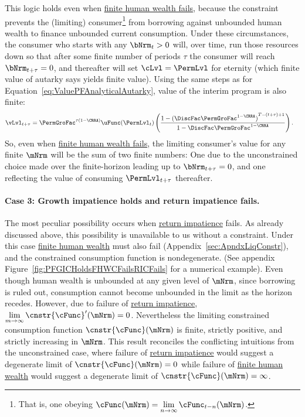 \documentclass[BufferStockTheory]{subfiles}
\begin{document}
This logic holds even when \hyperlink{FHWC}{finite human wealth fails}, because the constraint prevents the (limiting) consumer\footnote{That is, one obeying $\cFunc(\mNrm) = \lim\limits_{n \rightarrow \infty} \cFunc_{t-n}(\mNrm)$.} from borrowing against unbounded human wealth to finance unbounded current consumption.  Under these circumstances, the consumer who starts with any $\bNrm_{t} > 0$ will, over time, run those resources down so that after some finite number of periods $\tau$ the consumer will reach $\bNrm_{t+\tau} = 0$, and thereafter will set $\cLvl = \PermLvl$ for eternity (which \hypertarget{PFFVAC}{finite value of autarky} says yields finite value).  Using the same steps as for Equation~\eqref{eq:ValuePFAnalyticalAutarky}, value of the interim program is also finite: \hypertarget{PFFVAC}{} \hypertarget{PFVAFacDefn}{}
\begin{align*}
  \vLvl_{t+\tau} 
  & = \PermGroFac^{\tau(1-\CRRA)} \uFunc(\PermLvl_{t})\left(\frac{1-{(\DiscFac \PermGroFac^{1-\CRRA})}^{T-(t+\tau)+1}}{1-\DiscFac \PermGroFac^{1-\CRRA}}\right).
\end{align*}
So, even when \hyperlink{FHWC}{finite human wealth fails}, the limiting consumer's value for any finite $\mNrm$ will be the sum of two finite numbers: One due to the unconstrained choice made over the finite-horizon leading up to $\bNrm_{t+\tau} = 0$, and one reflecting the value of consuming $\PermLvl_{t+\tau}$ thereafter.

\hypertarget{RICandFHWCFail}{}
\paragraph{Case 3: Growth impatience holds and return impatience fails.} The most peculiar possibility occurs when   \hyperlink{RIC}{return impatience} fails. As already discussed above, this possibility is unavailable to us without a constraint. Under this case \hyperlink{FHWC}{finite human wealth} must also fail (Appendix~\ref{sec:ApndxLiqConstr}), and the constrained consumption function is nondegenerate.  (See appendix Figure~\ref{fig:PFGICHoldsFHWCFailsRICFails} for a numerical example). Even though human wealth is unbounded at any given level of $\mNrm$, since borrowing is ruled out, consumption cannot become unbounded in the limit as the horizon recedes. However, due to failure of \hyperlink{RIC}{return impatience},  $\lim\limits_{m \rightarrow \infty} \cnstr{\cFunc}^{\prime}(\mNrm) = 0$. Nevertheless the limiting constrained consumption function $\cnstr{\cFunc}(\mNrm)$ is finite, strictly positive, and strictly increasing in $\mNrm$.  This result reconciles the conflicting intuitions from the unconstrained case, where failure of \hyperlink{RIC}{return impatience} would suggest a degenerate limit of $\cnstr{\cFunc}(\mNrm)=0$ while failure of \hyperlink{FHWC}{finite human wealth} would suggest a degenerate limit of $\cnstr{\cFunc}(\mNrm)=\infty$. 
\end{document}
